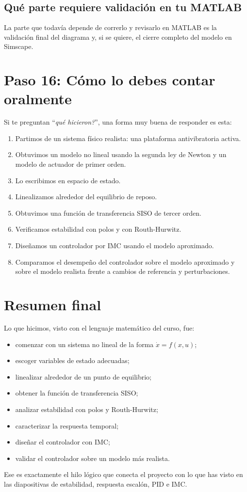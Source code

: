 \documentclass[11pt]{article}
\begin{document}
\subsection{Qu\'e parte requiere validaci\'on en tu MATLAB}

La parte que todav\'ia depende de correrlo y revisarlo en MATLAB es la validaci\'on final del diagrama y, si se quiere, el cierre completo del modelo en Simscape.

\section{Paso 16: C\'omo lo debes contar oralmente}

Si te preguntan ``\textit{qu\'e hicieron?}'', una forma muy buena de responder es esta:

\begin{enumerate}[leftmargin=1.2cm]
\item Partimos de un sistema f\'isico realista: una plataforma antivibratoria activa.
\item Obtuvimos un modelo no lineal usando la segunda ley de Newton y un modelo de actuador de primer orden.
\item Lo escribimos en espacio de estado.
\item Linealizamos alrededor del equilibrio de reposo.
\item Obtuvimos una funci\'on de transferencia SISO de tercer orden.
\item Verificamos estabilidad con polos y con Routh-Hurwitz.
\item Dise\~namos un controlador por IMC usando el modelo aproximado.
\item Comparamos el desempe\~no del controlador sobre el modelo aproximado y sobre el modelo realista frente a cambios de referencia y perturbaciones.
\end{enumerate}

\section{Resumen final}

Lo que hicimos, visto con el lenguaje matem\'atico del curso, fue:

\begin{itemize}[leftmargin=1.2cm]
\item comenzar con un sistema no lineal de la forma $\dot{x}=f(x,u)$;
\item escoger variables de estado adecuadas;
\item linealizar alrededor de un punto de equilibrio;
\item obtener la funci\'on de transferencia SISO;
\item analizar estabilidad con polos y Routh-Hurwitz;
\item caracterizar la respuesta temporal;
\item dise\~nar el controlador con IMC;
\item validar el controlador sobre un modelo m\'as realista.
\end{itemize}

Ese es exactamente el hilo l\'ogico que conecta el proyecto con lo que has visto en las diapositivas de estabilidad, respuesta escal\'on, PID e IMC.
\end{document}
